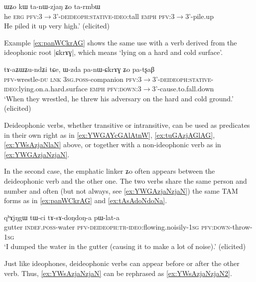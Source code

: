 \documentclass[oldfontcommands,oneside,a4paper,11pt]{article}
\newcommand{\ipa}[1]{{\phon \mbox{#1}}} %
\begin{document}
     \begin{exe}
     \ex \label{ex:tanWzjaN}
\gll
\ipa{ɯʑo} 	\ipa{kɯ} 	\ipa{ta-nɯ-zjaŋ} 	\ipa{ʑo} 	\ipa{ta-rmbɯ} \\
he \textsc{erg} \textsc{pfv:3$\rightarrow$3'-deideoph:stative-ideo}:tall \textsc{emph} \textsc{pfv}:3$\rightarrow$3'-pile.up  \\
\glt  He piled it up very high.' (elicited)
\end{exe}

Example \ref{ex:panWCkrAG} shows the same use with a verb derived from the ideophonic root |\ipa{ɕkrɤɣ}|, which means  `lying on a hard and cold surface'.

     \begin{exe}
     \ex \label{ex:panWCkrAG}
\gll
\ipa{tɤ-aʑɯʑu-ndʑi} 	\ipa{tɕe,} 	\ipa{ɯ-zda} 	\ipa{pa-nɯ-ɕkrɤɣ} 	\ipa{ʑo} 	\ipa{pa-tʂaβ} \\
\textsc{pfv}-wrestle-\textsc{du} \textsc{lnk} \textsc{3sg.poss}-companion \textsc{pfv:3$\rightarrow$3'-deideoph:stative-ideo}:lying.on.a.hard.surface \textsc{emph} \textsc{pfv:down:3$\rightarrow$3'}-cause.to.fall.down \\
\glt `When they wrestled, he threw his adversary on the hard and cold ground.' (elicited) 
\end{exe}


Deideophonic verbs, whether transitive or intransitive, can be used as predicates in their own right as in \ref{ex:YWGAYcGAlAtnW}, \ref{ex:tuGAzjAGlAG}, \ref{ex:YWsAzjaNlaN} above, or together with a non-ideophonic verb as in \ref{ex:YWGAzjaNzjaN}. 

	In the second case, the emphatic linker \ipa{ʑo} often appears between the deideophonic verb and the other one. The two verbs    share the same person and number and often (but not always, see \ref{ex:YWGAzjaNzjaN}) the same TAM forms as in \ref{ex:panWCkrAG} and \ref{ex:tAsAdoNdoNa}.
	
	     \begin{exe}
     \ex \label{ex:tAsAdoNdoNa}
\gll
	\ipa{qʰɤjŋgɯ} 	\ipa{tɯ-ci} 	\ipa{tɤ-sɤ-doŋdoŋ-a} 	\ipa{pɯ-lat-a}\\
gutter \textsc{indef.poss}-water \textsc{pfv-deideoph:tr-ideo}:flowing.noisily-\textsc{1sg} \textsc{pfv:down}-throw-\textsc{1sg} \\
\glt `I dumped the water in the gutter (causing it to make a lot of noise).' (elicited)
\end{exe}

Just like ideophones, deideophonic verbs can appear before or after the other verb. Thus, \ref{ex:YWsAzjaNzjaN} can be rephrased as \ref{ex:YWsAzjaNzjaN2}.
\end{document}
